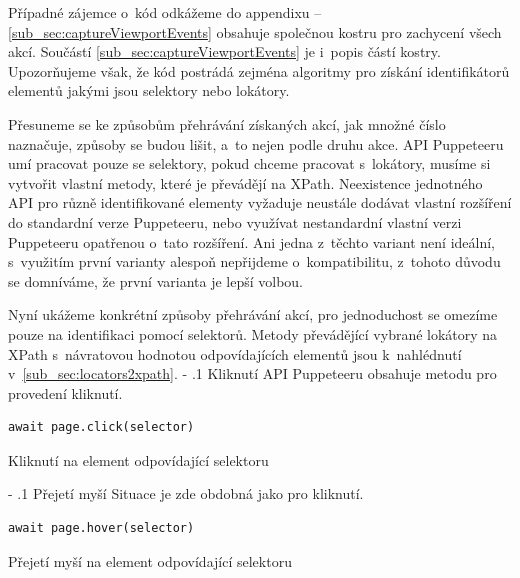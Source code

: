 \documentclass[12pt, a4paper, twoside]{article}
\makeatletter
\newcommand{\codefigureSpacing}{1.2}
\renewcommand\paragraph{%
	\@startsection{subparagraph}{5}{0mm}%
	{-\baselineskip}%
	{.1\baselineskip}%
	{\normalfont\normalsize\bfseries}}
\makeatother
\begin{document}
	Případné zájemce o~kód odkážeme do appendixu -- \ref{sub_sec:captureViewportEvents} obsahuje společnou kostru pro zachycení všech akcí. Součástí \ref{sub_sec:captureViewportEvents} je i~popis částí kostry. Upozorňujeme však, že kód postrádá zejména algoritmy pro získání identifikátorů elementů jakými jsou selektory nebo lokátory.
	
	Přesuneme se ke způsobům přehrávání získaných akcí, jak množné číslo naznačuje, způsoby se budou lišit, a~to nejen podle druhu akce. API Puppeteeru umí pracovat pouze se selektory, pokud chceme pracovat s~lokátory, musíme si vytvořit vlastní metody, které je převádějí na XPath. Neexistence jednotného API pro různě identifikované elementy vyžaduje neustále dodávat vlastní rozšíření do standardní verze Puppeteeru, nebo využívat nestandardní vlastní verzi Puppeteeru opatřenou o~tato rozšíření. Ani jedna z~těchto variant není ideální, s~využitím první varianty alespoň nepřijdeme o~kompatibilitu, z~tohoto důvodu se domníváme, že první varianta je lepší volbou.

	Nyní ukážeme konkrétní způsoby přehrávání akcí, pro jednoduchost se omezíme pouze na identifikaci pomocí selektorů. Metody převádějící vybrané lokátory na XPath s~návratovou hodnotou odpovídajících elementů jsou k~nahlédnutí v~\ref{sub_sec:locators2xpath}.
	\paragraph{Kliknutí}
	API Puppeteeru obsahuje metodu pro provedení kliknutí.
	\nopagebreak
	\begin{codefigure}[H]
		\renewcommand\baselinestretch{\codefigureSpacing}
	\begin{lstlisting}[style=MyJavaScript]
await page.click(selector)
	\end{lstlisting}
	\caption{Kliknutí na element odpovídající selektoru}
	\end{codefigure}
	\paragraph{Přejetí myší}
	Situace je zde obdobná jako pro kliknutí.
	\nopagebreak
	\begin{codefigure}[H]
		\renewcommand\baselinestretch{\codefigureSpacing}
	\begin{lstlisting}[style=MyJavaScript]
await page.hover(selector)
	\end{lstlisting}
	\caption{Přejetí myší na element odpovídající selektoru}
	\end{codefigure}	
\end{document}
